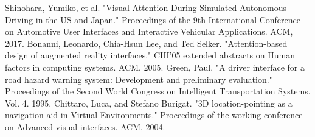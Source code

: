 \documentclass[a4paper, 11pt]{article}
\begin{document}
\begin{thebibliography}{9}
 Shinohara, Yumiko, et al. "Visual Attention During Simulated Autonomous Driving in the US and Japan." Proceedings of the 9th International Conference on Automotive User Interfaces and Interactive Vehicular Applications. ACM, 2017.
 Bonanni, Leonardo, Chia-Hsun Lee, and Ted Selker. "Attention-based design of augmented reality interfaces." CHI'05 extended abstracts on Human factors in computing systems. ACM, 2005.
 Green, Paul. "A driver interface for a road hazard warning system: Development and preliminary evaluation." Proceedings of the Second World Congress on Intelligent Transportation Systems. Vol. 4. 1995.
 Chittaro, Luca, and Stefano Burigat. "3D location-pointing as a navigation aid in Virtual Environments." Proceedings of the working conference on Advanced visual interfaces. ACM, 2004.
\end{thebibliography}
\end{document}
